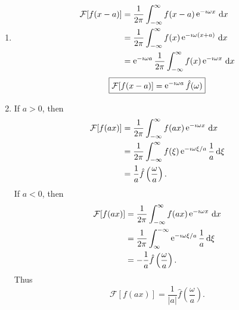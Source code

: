 {%
\begin{Solution}
  \label{solution ode ft f(x-a) f(a x)}
  \begin{enumerate}
  \item
    \begin{align*}
      \mathcal{F}[f(x - a)] 
      &= \frac{1}{2 \pi} \int_{-\infty}^\infty f(x - a) \mathop{\mathrm{e}}\nolimits^{-\imath \omega x}\,\mathrm{d} x
      \\
      &= \frac{1}{2 \pi} \int_{-\infty}^\infty f(x) \mathop{\mathrm{e}}\nolimits^{-\imath \omega (x + a)}\,\mathrm{d} x
      \\
      &= \mathop{\mathrm{e}}\nolimits^{-\imath \omega a} \frac{1}{2 \pi} \int_{-\infty}^\infty f(x) \mathop{\mathrm{e}}\nolimits^{-\imath \omega x}\,\mathrm{d} x
    \end{align*}
    \[
    \boxed{
      \mathcal{F}[f(x - a)] = \mathop{\mathrm{e}}\nolimits^{-\imath \omega a} \hat{f}(\omega)
      }
    \]
  \item
    If $a > 0$, then
    \begin{align*}
      \mathcal{F}[f(a x)] &= \frac{1}{2 \pi} \int_{-\infty}^\infty f(a x) \mathop{\mathrm{e}}\nolimits^{-\imath \omega x}\,\mathrm{d} x
      \\ 
      &= \frac{1}{2\pi} \int_{-\infty}^\infty f(\xi) \mathop{\mathrm{e}}\nolimits^{-\imath \omega \xi / a} \frac{1}{a} \,\mathrm{d} \xi
      \\ 
      &= \frac{1}{a} \hat{f} \left( \frac{\omega}{a} \right).
    \end{align*}
    If $a < 0$, then
    \begin{align*}
      \mathcal{F}[f(a x)] &= \frac{1}{2 \pi} \int_{-\infty}^\infty f(a x) \mathop{\mathrm{e}}\nolimits^{-\imath \omega x}\,\mathrm{d} x
      \\ 
      &= \frac{1}{2 \pi} \int_\infty^{-\infty} \mathop{\mathrm{e}}\nolimits^{-\imath \omega \xi / a} \frac{1}{a}\,\mathrm{d} \xi 
      \\
      &= - \frac{1}{a} \hat{f} \left( \frac{\omega}{a} \right).
    \end{align*}
    Thus
    \[ 
    \boxed{
      \mathcal{F}[f(a x)] = \frac{1}{|a|} \hat{f} \left( \frac{\omega}{a} \right).
      }
    \]
  \end{enumerate}
\end{Solution}






}

